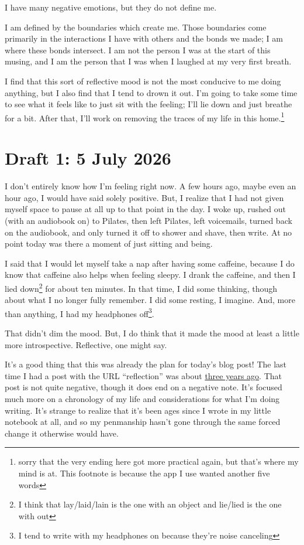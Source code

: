 \documentclass[12pt]{article}
\newcommand{\say}[1]{``#1''}
\renewcommand{\,}{\textsuperscript{,}}
\begin{document}
I have many negative emotions, but they do not define me.

I am defined by the boundaries which create me.  
Those boundaries come primarily in the interactions I have with others and the bonds we made; I am where these bonds intersect.  
I am not the person I was at the start of this musing, and I am the person that I was when I laughed at my very first breath.

I find that this sort of reflective mood is not the most conducive to me doing anything, but I also find that I tend to drown it out.  
I'm going to take some time to see what it feels like to just sit with the feeling; I'll lie down and just breathe for a bit.  
After that, I'll work on removing the traces of my life in this home.\footnote{sorry that the very ending here got more practical again, but that's where my mind is at. This footnote is because the app I use wanted another five words}

\section{Draft 1: 5 July 2026}

I don't entirely know how I'm feeling right now.  
A few hours ago, maybe even an hour ago, I would have said solely positive.  
But, I realize that I had not given myself space to pause at all up to that point in the day.  
I woke up, rushed out (with an audiobook on) to Pilates, then left Pilates, left voicemails, turned back on the audiobook, and only turned it off to shower and shave, then write.  
At no point today was there a moment of just sitting and being.

I said that I would let myself take a nap after having some caffeine, because I do know that caffeine also helps when feeling sleepy.  
I drank the caffeine, and then I lied down\footnote{I think that lay/laid/lain is the one with an object and lie/lied is the one with out} for about ten minutes.  
In that time, I did some thinking, though about what I no longer fully remember.  
I did some resting, I imagine.  
And, more than anything, I had my headphones off\footnote{I tend to write with my headphones on because they're noise canceling}.

That didn't dim the mood.  
But, I do think that it made the mood at least a little more introspective.  
Reflective, one might say.

It's a good thing that this was already the plan for today's blog post!  
The last time I had a post with the URL \say{reflection} was about \href{reflection}{three years ago}.  
That post is not quite negative, though it does end on a negative note.  
It's focused much more on a chronology of my life and considerations for what I'm doing writing.  
It's strange to realize that it's been ages since I wrote in my little notebook at all, and so my penmanship hasn't gone through the same forced change it otherwise would have.
\end{document}
